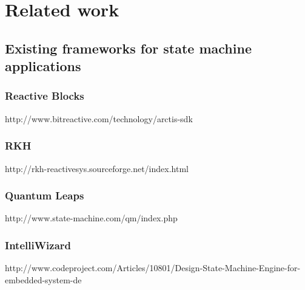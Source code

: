 \chapter{Related work}
\label{ch:related_work}

\section{Existing frameworks for state machine applications}

\subsection{Reactive Blocks}
http://www.bitreactive.com/technology/arctis-sdk

\subsection{RKH}
http://rkh-reactivesys.sourceforge.net/index.html

\subsection{Quantum Leaps}
http://www.state-machine.com/qm/index.php

\subsection{IntelliWizard}
http://www.codeproject.com/Articles/10801/Design-State-Machine-Engine-for-embedded-system-de